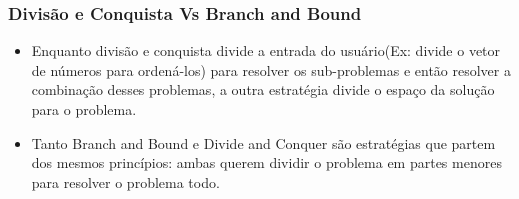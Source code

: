       \subsubsection{Divisão e Conquista Vs Branch and Bound}

      \begin{itemize}
          \item Enquanto divisão e conquista divide a entrada do usuário(Ex: divide o vetor de 
          números para ordená-los) para resolver os sub-problemas e então resolver a combinação
          desses problemas, a outra estratégia divide o espaço da solução para o problema.
          \item Tanto Branch and Bound e Divide and Conquer são estratégias que partem dos 
          mesmos princípios: ambas querem dividir o problema em partes menores para resolver 
          o problema todo.
      \end{itemize}

    \nocite{divide-and-conquer}
    \nocite{closest-pair-of-points}
\newpage